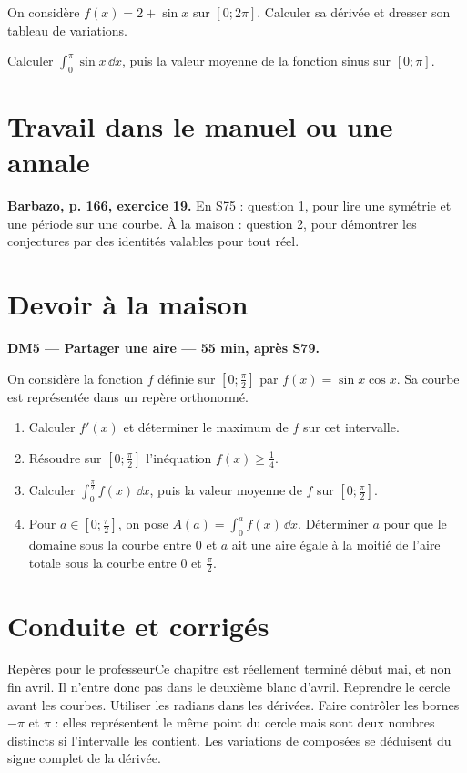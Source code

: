 On considère $f(x)=2+\sin x$ sur $[0;2\pi]$. Calculer sa dérivée et dresser son tableau de variations.

Calculer $\displaystyle\int_0^\pi\sin x\,\dd x$, puis la valeur moyenne de la fonction sinus sur $[0;\pi]$.

\section{Travail dans le manuel ou une annale}\textbf{Barbazo, p. 166, exercice 19.} En S75 : question 1, pour lire une symétrie et une période sur une courbe. À la maison : question 2, pour démontrer les conjectures par des identités valables pour tout réel.

\section{Devoir à la maison}\textbf{DM5 --- Partager une aire --- 55 min, après S79.}\par On considère la fonction $f$ définie sur $[0;\frac\pi2]$ par $f(x)=\sin x\cos x$. Sa courbe est représentée dans un repère orthonormé.
\begin{enumerate}\item Calculer $f' (x)$ et déterminer le maximum de $f$ sur cet intervalle.
\item Résoudre sur $[0;\frac\pi2]$ l'inéquation $f(x)\ge\frac14$.
\item Calculer $\displaystyle\int_0^{\frac{\pi}{2}}f(x)\,\dd x$, puis la valeur moyenne de $f$ sur $[0;\frac\pi2]$.
\item Pour $a\in[0;\frac\pi2]$, on pose $A(a)=\displaystyle\int_0^a f(x)\,\dd x$. Déterminer $a$ pour que le domaine sous la courbe entre $0$ et $a$ ait une aire égale à la moitié de l'aire totale sous la courbe entre $0$ et $\frac\pi2$.\end{enumerate}

\ifprof\clearpage\section{Conduite et corrigés}\begin{profbox}{Repères pour le professeur}Ce chapitre est réellement terminé début mai, et non fin avril. Il n'entre donc pas dans le deuxième blanc d'avril. Reprendre le cercle avant les courbes. Utiliser les radians dans les dérivées. Faire contrôler les bornes $-\pi$ et $\pi$ : elles représentent le même point du cercle mais sont deux nombres distincts si l'intervalle les contient. Les variations de composées se déduisent du signe complet de la dérivée.\end{profbox}

